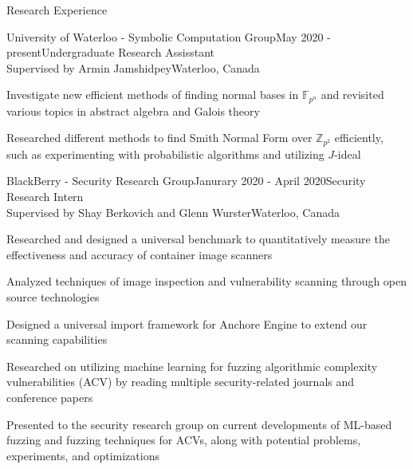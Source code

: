 \documentclass{cv}
\begin{document}
\begin{rSection}{Research Experience}
\begin{rSubsection}{University of Waterloo - Symbolic Computation Group}{May 2020 - present}{Undergraduate Research Assisstant \\ Supervised by Armin Jamshidpey}{Waterloo, Canada}
  	\item Investigate new efficient methods of finding normal bases in $\mathbb{F}_{p^n}$ and revisited various topics in abstract algebra and Galois theory\item Researched different methods to find Smith Normal Form over $\mathbb{Z}_{p^2}$ efficiently, such as experimenting with probabilistic algorithms and utilizing $J$-ideal
\end{rSubsection}

\begin{rSubsection}{BlackBerry - Security Research Group}{Janurary 2020 - April 2020}{Security Research Intern \\ Supervised by Shay Berkovich and Glenn Wurster}{Waterloo, Canada}
	\item Researched and designed a universal benchmark to quantitatively measure the effectiveness and accuracy of container image scanners
	\item Analyzed techniques of image inspection and vulnerability scanning through open source technologies
	\item Designed a universal import framework for Anchore Engine to extend our scanning capabilities
	\item Researched on utilizing machine learning for fuzzing algorithmic complexity vulnerabilities (ACV) by reading multiple security-related journals and conference papers
	\item Presented to the security research group on current developments of ML-based fuzzing and fuzzing techniques for ACVs, along with potential problems, experiments, and optimizations
\end{rSubsection}
\end{rSection}
\end{document}
